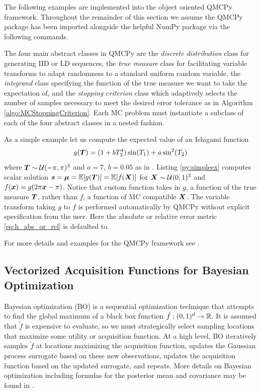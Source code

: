 \documentclass{article}[12pt]
\begin{document}
The following examples are implemented into the object oriented QMCPy framework. Throughout the remainder of this section we assume the QMCPy package \cite{QMCPy} has been imported alongside the helpful NumPy \cite{numpy} package via the following commands. 

The four main abstract classes in QMCPy are the \emph{discrete distribution} class for generating IID or LD sequences, the \emph{true measure} class for facilitating variable transforms to adapt randomness to a standard uniform random variable, the \emph{integrand} class specifying the function of the true measure we want to take the expectation of, and the \emph{stopping criterion} class which adaptively selects the number of samples necessary to meet the desired error tolerance as in Algorithm \ref{algo:MCStoppingCriterion}. Each MC problem must instantiate a subclass of each of the four abstract classes in a nested fashion. 

As a simple example let us compute the expected value of an Ishigami function \cite{ishigami1990importance}
\begin{equation}
    g(\boldsymbol{T}) = (1+bT_3^4)\sin(T_1)+a\sin^2(T_2)
    \label{eq:ishigami}
\end{equation}
where $\boldsymbol{T} \sim \mathcal{U}(-\pi,\pi)^3$ and $a=7$, $b=0.05$ as in \cite{sobol1999use}. Listing \ref{py:simpleex} computes scalar solution $\boldsymbol{s} = \boldsymbol{\mu} = \mathbb{E}[g(\boldsymbol{T})]=\mathbb{E}[f(\boldsymbol{X})]$ for $\boldsymbol{X} \sim \mathcal{U}(0,1)^3$ and $f(\boldsymbol{x}) = g(2\pi\boldsymbol{x}-\pi)$. Notice that custom function takes in $g$, a function of the true measure $\boldsymbol{T}$, rather than $f$, a function of MC compatible $\boldsymbol{X}$. The variable transform taking $g$ to $f$ is performed automatically by QMCPy without explicit specification from the user. Here the absolute or relative error metric \eqref{eq:h_abs_or_rel} is defaulted to. 

For more details and examples for the QMCPy framework see \cite{QMCSoftware}.

\subsection{Vectorized Acquisition Functions for Bayesian Optimization}

Bayesian optimization (BO) is a sequential optimization technique that attempts to find the global maximum of a black box function $\tilde{f}: (0,1)^{d} \to \mathbb{R}$. It is assumed that $\tilde{f}$ is expensive to evaluate, so we must strategically select sampling locations that maximize some utility or acquisition function. At a high level, BO iteratively samples $\tilde{f}$ at locations maximizing the acquisition function, updates the Gaussian process surrogate based on these new observations, updates the acquisition function based on the updated surrogate, and repeats. More details on Bayesian optimization including formulas for the posterior mean and covariance may be found in \cite{frazier2018tutorial}.
\end{document}
